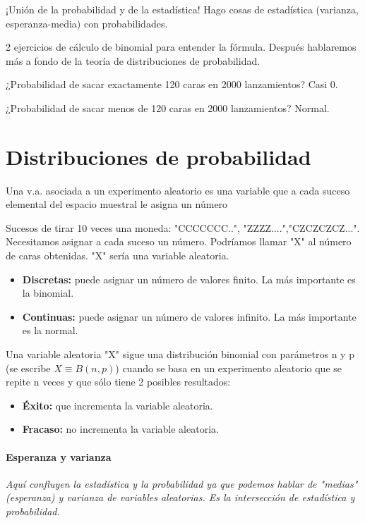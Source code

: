 ¡Unión de la probabilidad y de la estadística! Hago cosas de estadística (varianza, esperanza-media) con probabilidades.

2 ejercicios de cálculo de binomial para entender la fórmula. Después hablaremos más a fondo de la teoría de distribuciones de probabilidad.

¿Probabilidad de sacar exactamente 120 caras en 2000 lanzamientos? Casi 0.

¿Probabilidad de sacar menos de 120 caras en 2000 lanzamientos? Normal.

\section{Distribuciones de probabilidad}

\begin{defn}
Una v.a. asociada a un experimento aleatorio es una variable que a cada suceso elemental del espacio muestral le asigna un número
\end{defn}
Sucesos de tirar 10 veces una moneda: "CCCCCCC..", "ZZZZ....","CZCZCZCZ...". Necesitamos asignar a cada suceso un número. 
%
Podríamos llamar "X" al número de caras obtenidas. "X" sería una variable aleatoria.

\begin{itemize}
    \item \textbf{Discretas:} puede asignar un número de valores finito. La más importante es la binomial.
    \item \textbf{Continuas: } puede asignar un número de valores infinito. La más importante es la normal.
\end{itemize}

\begin{defn}
Una variable aleatoria "X" sigue una distribución binomial con parámetros n y p (se escribe $X\equiv B(n,p)$) cuando se basa en un experimento aleatorio que se repite n veces y que sólo tiene 2 posibles resultados:
\begin{itemize}
    \item \textbf{Éxito:} que incrementa la variable aleatoria.
    \item \textbf{Fracaso:} no incrementa la variable aleatoria.
\end{itemize}
\end{defn}

\paragraph{Esperanza y varianza}
\textit{Aquí confluyen la estadística y la probabilidad ya que podemos hablar de "medias" (esperanza) y varianza de variables aleatorias. Es la intersección de estadística y probabilidad.}



